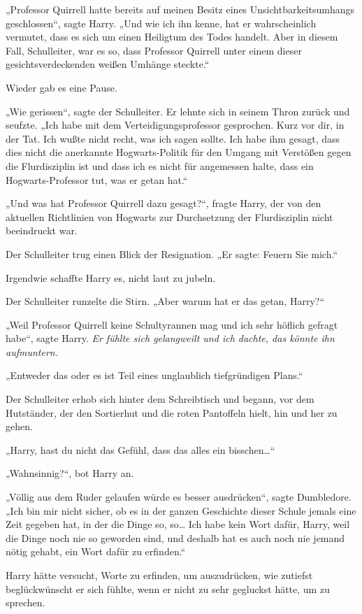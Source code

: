 {„Professor Quirrell hatte bereits auf meinen Besitz eines Unsichtbarkeitsumhangs geschlossen“, sagte Harry. „Und wie ich ihn kenne, hat er wahrscheinlich vermutet, dass es sich um einen Heiligtum des Todes handelt. Aber in diesem Fall, Schulleiter, war es so, dass Professor Quirrell unter einem dieser gesichtsverdeckenden weißen Umhänge steckte.“

Wieder gab es eine Pause.

„Wie gerissen“, sagte der Schulleiter. Er lehnte sich in seinem Thron zurück und seufzte. „Ich habe mit dem Verteidigungsprofessor gesprochen. Kurz vor dir, in der Tat. Ich wußte nicht recht, was ich sagen sollte. Ich habe ihm gesagt, dass dies nicht die anerkannte Hogwarts-Politik für den Umgang mit Verstößen gegen die Flurdisziplin ist und dass ich es nicht für angemessen halte, dass ein Hogwarts-Professor tut, was er getan hat.“

„Und was hat Professor Quirrell dazu gesagt?“, fragte Harry, der von den aktuellen Richtlinien von Hogwarts zur Durchsetzung der Flurdisziplin nicht beeindruckt war.

Der Schulleiter trug einen Blick der Resignation. „Er sagte: Feuern Sie mich.“

Irgendwie schaffte Harry es, nicht laut zu jubeln.

Der Schulleiter runzelte die Stirn. „Aber warum hat er das getan, Harry?“

„Weil Professor Quirrell keine Schultyrannen mag und ich sehr höflich gefragt habe“, sagte Harry. \emph{Er fühlte sich gelangweilt und ich dachte, das könnte ihn aufmuntern.}

„Entweder das oder es ist Teil eines unglaublich tiefgründigen Plans.“

Der Schulleiter erhob sich hinter dem Schreibtisch und begann, vor dem Hutständer, der den Sortierhut und die roten Pantoffeln hielt, hin und her zu gehen.

„Harry, hast du nicht das Gefühl, dass das alles ein bisschen…“

„Wahnsinnig?“, bot Harry an.

„Völlig aus dem Ruder gelaufen würde es besser ausdrücken“, sagte Dumbledore. „Ich bin mir nicht sicher, ob es in der ganzen Geschichte dieser Schule jemals eine Zeit gegeben hat, in der die Dinge so, so… Ich habe kein Wort dafür, Harry, weil die Dinge noch nie so geworden sind, und deshalb hat es auch noch nie jemand nötig gehabt, ein Wort dafür zu erfinden.“

Harry hätte versucht, Worte zu erfinden, um auszudrücken, wie zutiefst beglückwünscht er sich fühlte, wenn er nicht zu sehr gegluckst hätte, um zu sprechen.

}

